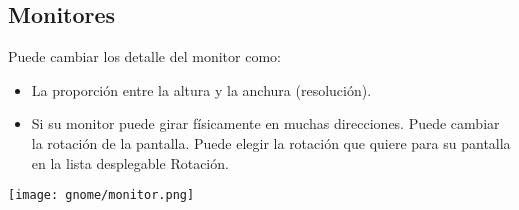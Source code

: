 \subsection{Monitores}
Puede cambiar los detalle del monitor como:
\begin{itemize}
\item La proporción entre la altura y la anchura (resolución).
\item Si su monitor puede girar físicamente en muchas direcciones. Puede cambiar la rotación de la pantalla. Puede elegir la rotación que quiere para su pantalla en la lista desplegable Rotación. 
\end{itemize}
\begin{center}
\texttt{[image: gnome/monitor.png]} 
\end{center}

